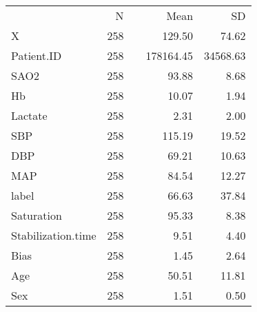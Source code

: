 \documentclass{article}
\begin{document}
 
\begin{center}
\begin{tabular}{lrrrr}
  \toprule
   & N &   & Mean & SD \\ 
    \cmidrule{2-2}  \cmidrule{4-5}
 X & 258 &  & 129.50 & 74.62 \\ 
  Patient.ID & 258 &  & 178164.45 & 34568.63 \\ 
  SAO2 & 258 &  & 93.88 & 8.68 \\ 
  Hb & 258 &  & 10.07 & 1.94 \\ 
  Lactate & 258 &  & 2.31 & 2.00 \\ 
  SBP & 258 &  & 115.19 & 19.52 \\ 
  DBP & 258 &  & 69.21 & 10.63 \\ 
  MAP & 258 &  & 84.54 & 12.27 \\ 
  label & 258 &  & 66.63 & 37.84 \\ 
  Saturation & 258 &  & 95.33 & 8.38 \\ 
  Stabilization.time & 258 &  & 9.51 & 4.40 \\ 
  Bias & 258 &  & 1.45 & 2.64 \\ 
  Age & 258 &  & 50.51 & 11.81 \\ 
  Sex & 258 &  & 1.51 & 0.50 \\ 
   \bottomrule
\end{tabular}
\end{center}
\end{document}

